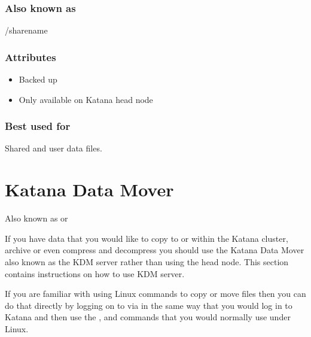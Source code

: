 \documentclass[letterpaper,10pt,english]{sphinxmanual}
\begin{document}
\subsubsection{Also known as}
\label{\detokenize{storage/storage_locations:id13}}
\begin{sphinxVerbatim}[commandchars=\\\{\}]
/sharename
\end{sphinxVerbatim}


\subsubsection{Attributes}
\label{\detokenize{storage/storage_locations:id14}}\begin{itemize}
\item {} 
Backed up

\item {} 
Only available on Katana head node

\end{itemize}


\subsubsection{Best used for}
\label{\detokenize{storage/storage_locations:id15}}
Shared and user data files.


\section{Katana Data Mover}
\label{\detokenize{storage/kdm:katana-data-mover}}\label{\detokenize{storage/kdm::doc}}
Also known as  or 

If you have data that you would like to copy to or within the Katana cluster, archive or even compress and decompress you should use the Katana Data Mover \sphinxhyphen{} also known as the KDM server \sphinxhyphen{} rather than using the head node. This section contains instructions on how to use KDM server.

If you are familiar with using Linux commands to copy or move files then you can do that directly by logging on to  via  in the same way that you would log in to Katana and then use the ,  and  commands that you would normally use under Linux.
\end{document}
